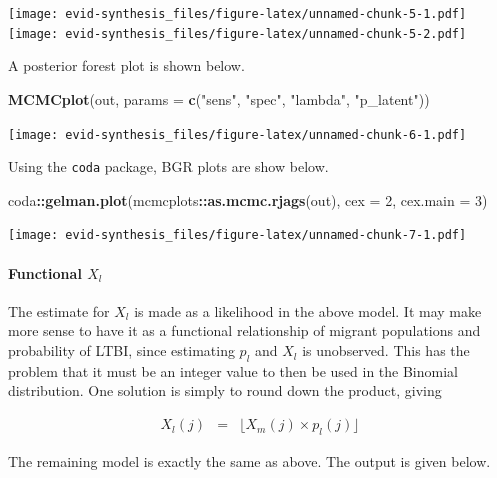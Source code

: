 \documentclass[]{article}
\newenvironment{Shaded}{\begin{snugshade}}{\end{snugshade}}
\newcommand{\DataTypeTok}[1]{\textcolor[rgb]{0.13,0.29,0.53}{#1}}
\newcommand{\DecValTok}[1]{\textcolor[rgb]{0.00,0.00,0.81}{#1}}
\newcommand{\KeywordTok}[1]{\textcolor[rgb]{0.13,0.29,0.53}{\textbf{#1}}}
\newcommand{\NormalTok}[1]{#1}
\newcommand{\OperatorTok}[1]{\textcolor[rgb]{0.81,0.36,0.00}{\textbf{#1}}}
\newcommand{\StringTok}[1]{\textcolor[rgb]{0.31,0.60,0.02}{#1}}
\let\oldparagraph\paragraph
\renewcommand{\paragraph}[1]{\oldparagraph{#1}\mbox{}}
\begin{document}
\texttt{[image: evid-synthesis\_files/figure-latex/unnamed-chunk-5-1.pdf]}
\texttt{[image: evid-synthesis\_files/figure-latex/unnamed-chunk-5-2.pdf]}

A posterior forest plot is shown below.

\begin{Shaded}
\begin{Highlighting}[]
\KeywordTok{MCMCplot}\NormalTok{(out,}
         \DataTypeTok{params =} \KeywordTok{c}\NormalTok{(}\StringTok{"sens"}\NormalTok{, }\StringTok{"spec"}\NormalTok{, }\StringTok{"lambda"}\NormalTok{, }\StringTok{"p_latent"}\NormalTok{))}
\end{Highlighting}
\end{Shaded}

\texttt{[image: evid-synthesis\_files/figure-latex/unnamed-chunk-6-1.pdf]}

Using the \texttt{coda} package, BGR plots are show below.

\begin{Shaded}
\begin{Highlighting}[]
\NormalTok{coda}\OperatorTok{::}\KeywordTok{gelman.plot}\NormalTok{(mcmcplots}\OperatorTok{::}\KeywordTok{as.mcmc.rjags}\NormalTok{(out), }\DataTypeTok{cex =} \DecValTok{2}\NormalTok{, }\DataTypeTok{cex.main =} \DecValTok{3}\NormalTok{)}
\end{Highlighting}
\end{Shaded}

\texttt{[image: evid-synthesis\_files/figure-latex/unnamed-chunk-7-1.pdf]}

\hypertarget{functional-x_l}{%
\paragraph{\texorpdfstring{Functional
\(X_l\)}{Functional X\_l}}\label{functional-x_l}}

The estimate for \(X_l\) is made as a likelihood in the above model. It
may make more sense to have it as a functional relationship of migrant
populations and probability of LTBI, since estimating \(p_l\) and
\(X_l\) is unobserved. This has the problem that it must be an integer
value to then be used in the Binomial distribution. One solution is
simply to round down the product, giving

\begin{eqnarray*}
X_l(j) &=& \lfloor X_m(j) \times p_l(j) \rfloor
\end{eqnarray*}

The remaining model is exactly the same as above. The output is given
below.
\end{document}
